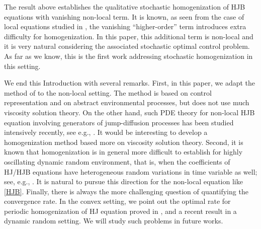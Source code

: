 \documentclass[11pt,reqno]{amsart}
\theoremstyle{definition}
\theoremstyle{remark}
\numberwithin{equation}{section}
\begin{document}
The result above establishes the qualitative stochastic homogenization of HJB equations with vanishing non-local term. It is known, as seen from the case of local equations studied in \cite{KRV06,LS05,AT15,JST17}, the vanishing ``higher-order'' term introduces extra difficulty for homogenization. In this paper, this additional term is non-local and it is very natural considering the associated stochastic optimal control problem. As far as we know, this is the first work addressing stochastic homogenization in this setting. 

We end this Introduction with several remarks. First, in this paper, we adapt the method of \cite{KRV06} to the non-local setting. The method is based on control representation and on abstract environmental processes, but does not use much viscosity solution theory. On the other hand, such PDE theory for non-local HJB equation involving generators of jump-diffusion processes has been studied intensively recently, see e.g., \cite{MR2422079,MR4024555,MR5058962}. It would be interesting to develop a homogenization method based more on viscosity solution theory. Second, it is known that homogenization is in general more difficult to establish for highly oscillating dynamic random environment, that is, when the coefficients of HJ/HJB equations have heterogeneous random variations in time variable as well; see, e.g., \cite{KV-HJB,JST17,MR3817561}. It is natural to pursue this direction for the non-local equation like \eqref{HJB}. Finally, there is always the more challenging question of quantifying the convergence rate. In the convex setting, we point out the optimal rate for periodic homogenization of HJ equation proved in \cite{MR4946874}, and a recent result \cite{guo2026quantificationergodicityhamiltonjacobiequations} in a dynamic random setting. We will study such problems in future works.
\end{document}
